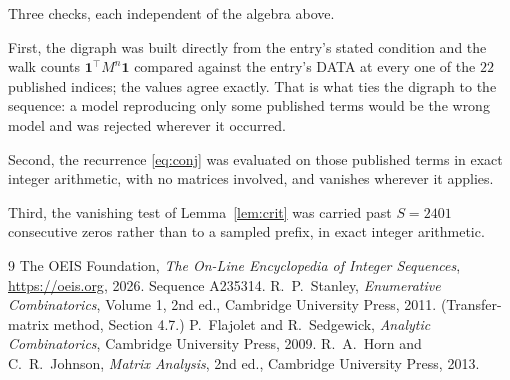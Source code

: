 \documentclass[11pt,a4paper]{article}
\theoremstyle{plain}
\theoremstyle{definition}
\begin{document}
Three checks, each independent of the algebra above.

First, the digraph was built directly from the entry's stated condition and the walk counts
$\mathbf{1}^{\!\top}M^{n}\mathbf{1}$ compared against the entry's DATA at every one of
the $22$ published indices; the values agree exactly. That is what ties the digraph to
the sequence: a model reproducing only some published terms would be the wrong model and
was rejected wherever it occurred.

Second, the recurrence \eqref{eq:conj} was evaluated on those published terms in exact
integer arithmetic, with no matrices involved, and vanishes wherever it applies.

Third, the vanishing test of Lemma~\ref{lem:crit} was carried past $S=2401$ consecutive
zeros rather than to a sampled prefix, in exact integer arithmetic.

\begin{thebibliography}{9}
 The OEIS Foundation, \emph{The On-Line Encyclopedia of Integer
Sequences}, \url{https://oeis.org}, 2026. Sequence A235314.
 R.~P.~Stanley, \emph{Enumerative Combinatorics}, Volume 1, 2nd ed.,
Cambridge University Press, 2011. (Transfer-matrix method, Section 4.7.)
 P.~Flajolet and R.~Sedgewick, \emph{Analytic Combinatorics}, Cambridge
University Press, 2009.
 R.~A.~Horn and C.~R.~Johnson, \emph{Matrix Analysis}, 2nd ed., Cambridge
University Press, 2013.
\end{thebibliography}
\end{document}
